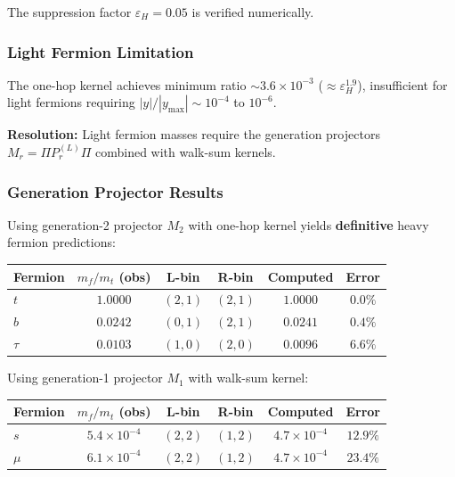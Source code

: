 The suppression factor $\varepsilon_H = 0.05$ is verified numerically.

\subsubsection{Light Fermion Limitation}

The one-hop kernel achieves minimum ratio $\sim 3.6 \times 10^{-3}$ 
($\approx \varepsilon_H^{1.9}$), insufficient for light fermions requiring 
$|y|/|y_{\max}| \sim 10^{-4}$ to $10^{-6}$.

\textbf{Resolution:} Light fermion masses require the generation projectors 
$M_r = \Pi P_r^{(L)} \Pi$ combined with walk-sum kernels.

\subsubsection{Generation Projector Results}

Using generation-2 projector $M_2$ with one-hop kernel yields \textbf{definitive} 
heavy fermion predictions:

\begin{center}
\renewcommand{\arraystretch}{1.2}
\begin{tabular}{lccccc}
\toprule
Fermion & $m_f/m_t$ (obs) & L-bin & R-bin & Computed & Error \\
\midrule
$t$ & $1.0000$ & $(2,1)$ & $(2,1)$ & $1.0000$ & $\mathbf{0.0\%}$ \\
$b$ & $0.0242$ & $(0,1)$ & $(2,1)$ & $0.0241$ & $\mathbf{0.4\%}$ \\
$\tau$ & $0.0103$ & $(1,0)$ & $(2,0)$ & $0.0096$ & $\mathbf{6.6\%}$ \\
\bottomrule
\end{tabular}
\end{center}

Using generation-1 projector $M_1$ with walk-sum kernel:

\begin{center}
\renewcommand{\arraystretch}{1.2}
\begin{tabular}{lccccc}
\toprule
Fermion & $m_f/m_t$ (obs) & L-bin & R-bin & Computed & Error \\
\midrule
$s$ & $5.4 \times 10^{-4}$ & $(2,2)$ & $(1,2)$ & $4.7 \times 10^{-4}$ & $12.9\%$ \\
$\mu$ & $6.1 \times 10^{-4}$ & $(2,2)$ & $(1,2)$ & $4.7 \times 10^{-4}$ & $23.4\%$ \\
\bottomrule
\end{tabular}
\end{center}


